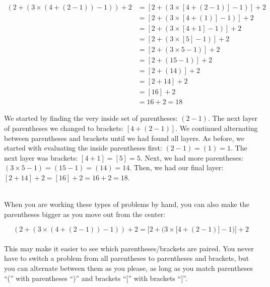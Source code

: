  {
\begin{equation}\label{eqn:parentheses_brackets}
	\begin{split}
		(2+(3\times(4+(2-1)) -1)) +2 & = [2+(3\times[4+(2-1)] -1)] +2 \\
					     & = [2+(3\times[4+(1)]-1)]+2 \\
					     & = [2+(3\times[4+1]-1)]+2 \\
					     & = [2+(3\times[5]-1)]+2 \\
					     & = [2+(3\times 5 -1)] + 2 \\
					     & = [2+(15-1)]+2 \\
					     & = [2+(14)]+2 \\
					     & = [2+14] + 2 \\
					     & = [16] + 2 \\
					     & = 16 + 2 =18
	\end{split}
\end{equation}


We started by finding the very inside set of parentheses: $(2-1)$. The next layer of parentheses we changed to brackets: $[4+(2-1)]$. We continued alternating between parentheses and brackets until we had found all layers. As before, we started with evaluating the inside parentheses first: $(2-1)=(1)=1$. The next layer was brackets: $[4+1]=[5]=5$. Next, we had more parentheses: $(3\times 5 -1)=(15-1)=(14)=14$. Then, we had our final layer: $[2+14]+2=[16]+2=16+2=18$.}\\

When you are working these types of problems by hand, you can also make the parentheses bigger as you move out from the center:

\begin{equation*}\label{eqn:sizes_of_parentheses}
	(2+(3\times(4+(2-1)) -1)) +2  = \bigg[2+\Big(3\times \big[4+(2-1)\big] -1\Big)\bigg] +2
\end{equation*}\\

This may make it easier to see which parentheses/brackets are paired. You never have to switch a problem from all parentheses to parentheses and brackets, but you can alternate between them as you please, as long as you match parentheses ``('' with parentheses ``)'' and brackets ``['' with brackets ``]''.

